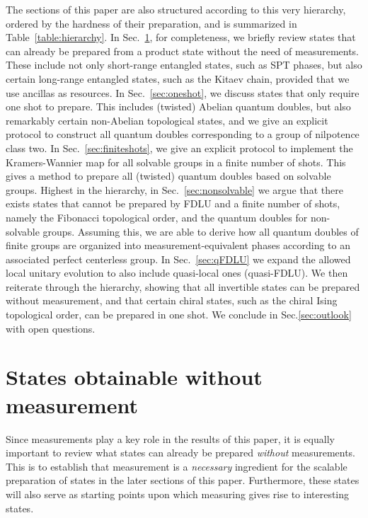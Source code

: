 \documentclass[nofootinbib,prx,twocolumn,showpacs,superscriptaddress,notitlepage,amsmath,amssymb]{revtex4-2}
\theoremstyle{definition}
\begin{document}
The sections of this paper are also structured according to this very hierarchy, ordered by the hardness of their preparation, and is summarized in Table~\ref{table:hierarchy}. In Sec.~\ref{sec:FDLU}, for completeness, we briefly review states that can already be prepared from a product state without the need of measurements. These include not only short-range entangled states, such as SPT phases, but also certain long-range entangled states, such as the Kitaev chain, provided that we use ancillas as resources. In Sec.~\ref{sec:oneshot}, we discuss states that only require one shot to prepare. This includes (twisted) Abelian quantum doubles, but also remarkably certain non-Abelian topological states, and we give an explicit protocol to construct all quantum doubles corresponding to a group of nilpotence class two. In Sec.~\ref{sec:finiteshots}, we give an explicit protocol to implement the Kramers-Wannier map for all solvable groups in a finite number of shots. This gives a method to prepare all (twisted) quantum doubles based on solvable groups. Highest in the hierarchy, in Sec.~\ref{sec:nonsolvable} we argue that there exists states that cannot be prepared by FDLU and a finite number of shots, namely the Fibonacci topological order, and the quantum doubles for non-solvable groups. Assuming this, we are able to derive how all quantum doubles of finite groups are organized into measurement-equivalent phases according to an associated perfect centerless group.  In Sec.~\ref{sec:qFDLU} we expand the allowed local unitary evolution to also include quasi-local ones (quasi-FDLU). We then reiterate through the hierarchy, showing that all invertible states can be prepared without measurement, and that certain chiral states, such as the chiral Ising topological order, can be prepared in one shot. We conclude in Sec.\ref{sec:outlook} with open questions.





\section{States obtainable without measurement}\label{sec:FDLU}

Since measurements play a key role in the results of this paper, it is equally important to review what states can already be prepared \textit{without} measurements. This is to establish that measurement is a \textit{necessary} ingredient for the scalable preparation of states in the later sections of this paper. Furthermore, these states will also serve as starting points upon which measuring gives rise to interesting states.
\end{document}
